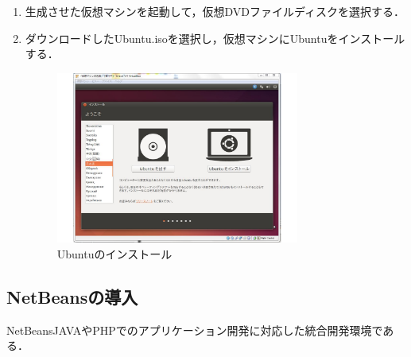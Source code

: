 \begin{enumerate}
\begin{figure}[htbp]
\end{figure}

 \item 	生成させた仮想マシンを起動して，仮想DVDファイルディスクを選択する．

 \item 	ダウンロードしたUbuntu.isoを選択し，仮想マシンにUbuntuをインストールする．


\begin{figure}[htbp]

\centering
\includegraphics[width=8cm,clip]{Ubuntuinstall.pdf}
\caption{Ubuntuのインストール}
\label{Ubuntuinstall}

\end{figure}

\end{enumerate}



\subsection{NetBeansの導入}

NetBeansJAVAやPHPでのアプリケーション開発に対応した統合開発環境である．


